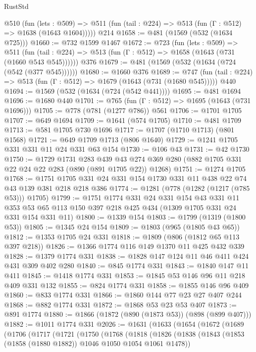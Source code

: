 \begin{lexlean}{RustStd}
\begin{coremodule}
{\begin{coremodule}
{{{{{{{    @510
      (fun (lets : @509) =>
      @511 (fun (tail : @224) => @513 (fun (Γ : @512) => @1638 (@1643 @1604)))))
    @214
@1658 := @481 (@1569 (@532 (@1634 @725)))
@1660 := @732 @1599 @1467
@1672 := @723
    (fun (lets : @509) =>
    @511 (fun (tail : @224) => @513 (fun (Γ : @512) => @1658 (@1643 (@731 (@1660 @543 @545))))))
    @376
@1679 := @481 (@1569 (@532 (@1634 (@724 (@542 (@377 @545))))))
@1680 := @1660 @376
@1689 := @747 (fun (tail : @224) => @513 (fun (Γ : @512) => @1679 (@1643 (@731 (@1680 @545))))) @440
@1694 := @1569 (@532 (@1634 (@724 (@542 @441))))
@1695 := @481 @1694
@1696 := @1680 @440
@1701 := @765 (fun (Γ : @512) => @1695 (@1643 (@731 @1696)))
@1705 := @778 (@781 (@1277 @786)) @561
@1706 := @1701 @1705
@1707 := @649 @1694
@1709 := @1641 (@574 @1705)
@1710 := @481 @1709
@1713 := @581 @1705 @730 @1696
@1717 := @1707 (@1710 @1713) (@801 @1568)
@1721 := @649 @1709 @1713 (@806 @1640)
@1729 := @1241 @1705 @331 @331 @11 @24 @331 @63 @154
@1730 := @106 @43
@1731 := @42 @1730
@1750 := @1729
    @1731
    @283
    @439
    @43
    @274
    @369
    @280
    (@882 @1705 @331 @22 @24 @22 @283 (@890 (@891 @1705 @22)) @1268)
@1751 := @1274 @1705
@1768 := @1751 @1705 @331 @24 @331 @154 @1730 @331 @11 @438 @22 @74 @43 @139 @381 @218 @218 @386
@1774 := @1281 (@778 (@1282 (@1217 (@785 @53))) @1705)
@1799 := @1751
    @1774
    @331
    @24
    @331
    @154
    @43
    @331
    @11
    @353
    @53
    @65
    @113
    @150
    @397
    @218
    @425
    @434
    (@1309 @1705 @331 @24 @331 @154 @331 @11)
@1800 := @1339 @154
@1803 := @1799 (@1319 (@1800 @53))
@1805 := @1345 @24 @154
@1809 := @1803 (@965 (@1805 @43 @65))
@1812 := @1353 @1705 @24 @331
@1818 := @1809 (@806 (@1812 @65 @113 @397 @218))
@1826 := @1366 @1774 @116 @149 @1370 @11 @425 @432 @339
@1828 := @1379 @1774 @331
@1838 := @1828 @147 @124 @11 @46 @411 @424 @431 @309 @402 @280
@1840 := @845 @1774 @331
@1843 := @1840 @147 @11 @411
@1845 := @1418 @1774 @331
@1853 := @1845 @53 @146 @96 @11 @218 @409 @331 @132
@1855 := @824 @1774 @331
@1858 := @1855 @146 @96 @409
@1860 := @833 @1774 @331
@1866 := @1860 @144 @77 @23 @27 @407 @244
@1868 := @882 @1774 @331
@1872 := @1868 @53 @23 @53 @407
@1873 := @891 @1774
@1880 := @1866 (@1872 (@890 (@1873 @53)) (@898 (@899 @407)))
@1882 := @1011 @1774 @331
@2026 := @1631
    (@1633
      (@1654
        (@1672
          (@1689
            (@1706
              (@1717
                (@1721
                  (@1750
                    (@1768
                      (@1818
                        (@1826
                          (@1838
                            (@1843 (@1853 (@1858 (@1880 @1882)) @1046 @1050 @1054 @1061 @1478))
}}}}}}}
\end{coremodule}}
\end{coremodule}
\end{lexlean}
